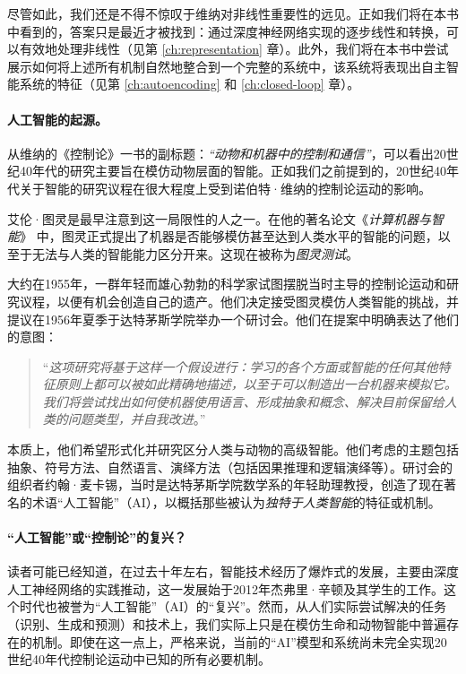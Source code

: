 \documentclass[../../book-main.tex]{subfiles}
\begin{document}
尽管如此，我们还是不得不惊叹于维纳对非线性重要性的远见。正如我们将在本书中看到的，答案只是最近才被找到：通过深度神经网络实现的逐步线性和转换，可以有效地处理非线性（见第 \ref{ch:representation} 章）。此外，我们将在本书中尝试展示如何将上述所有机制自然地整合到一个完整的系统中，该系统将表现出自主智能系统的特征（见第 \ref{ch:autoencoding} 和 \ref{ch:closed-loop} 章）。

\paragraph{人工智能的起源。}
从维纳的《控制论》一书的副标题：{\em ``动物和机器中的控制和通信''}，可以看出20世纪40年代的研究主要旨在模仿动物层面的智能。正如我们之前提到的，20世纪40年代关于智能的研究议程在很大程度上受到诺伯特·维纳的控制论运动的影响。

艾伦·图灵是最早注意到这一局限性的人之一。在他的著名论文《{\em 计算机器与智能}》 \cite{Turing-1950} 中，图灵正式提出了机器是否能够模仿甚至达到人类水平的智能的问题，以至于无法与人类的智能能力区分开来。这现在被称为{\em 图灵测试}。

大约在1955年，一群年轻而雄心勃勃的科学家试图摆脱当时主导的控制论运动和研究议程，以便有机会创造自己的遗产。他们决定接受图灵模仿人类智能的挑战，并提议在1956年夏季于达特茅斯学院举办一个研讨会。他们在提案中明确表达了他们的意图：

\begin{quote}
    ``{\em 这项研究将基于这样一个假设进行：学习的各个方面或智能的任何其他特征原则上都可以被如此精确地描述，以至于可以制造出一台机器来模拟它。我们将尝试找出如何使机器使用语言、形成抽象和概念、解决目前保留给人类的问题类型，并自我改进}。''
\end{quote}

本质上，他们希望形式化并研究区分人类与动物的高级智能。他们考虑的主题包括抽象、符号方法、自然语言、演绎方法（包括因果推理和逻辑演绎等）。研讨会的组织者约翰·麦卡锡，当时是达特茅斯学院数学系的年轻助理教授，创造了现在著名的术语“人工智能”（AI），以概括那些被认为{\em 独特于人类智能}的特征或机制。

\paragraph{“人工智能”或“控制论”的复兴？}
读者可能已经知道，在过去十年左右，智能技术经历了爆炸式的发展，主要由深度人工神经网络的实践推动，这一发展始于2012年杰弗里·辛顿及其学生的工作\cite{Krizhevsky2012imagenet}。这个时代也被誉为“人工智能”（AI）的“复兴”。然而，从人们实际尝试解决的任务（识别、生成和预测）和技术上，我们实际上只是在模仿生命和动物智能中普遍存在的机制。即使在这一点上，严格来说，当前的“AI”模型和系统尚未完全实现20世纪40年代控制论运动中已知的所有必要机制。
\end{document}
